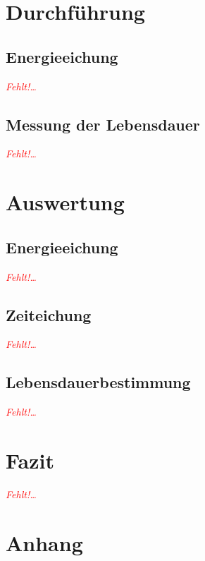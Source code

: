 \documentclass[12pt,a4paper,ngerman]{report}
\providecommand{\fehlt}{\textcolor{red}{\emph{Fehlt!\dots}}}
\begin{document}
\chapter{Durchführung}
	\section{Energieeichung}
		\fehlt
	\section{Messung der Lebensdauer}
		\fehlt

\chapter{Auswertung}
	\section{Energieeichung}
		\fehlt
	\section{Zeiteichung}
		\fehlt
	\section{Lebensdauerbestimmung}
		\fehlt


\chapter{Fazit}

	\listoffigures
	
	\begin{thebibliography}{111} %
		\fehlt
		
		
		
	\end{thebibliography}


\chapter*{Anhang} \label{ch:Anhang}
\FloatBarrier
\end{document}
